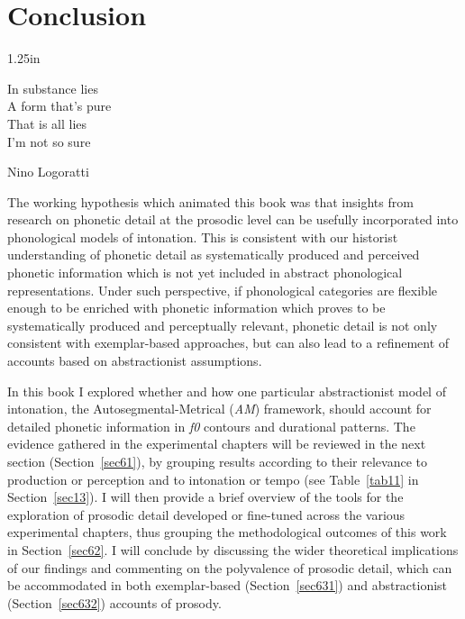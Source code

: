 \chapter{Conclusion}\label{sec6}
\epigraph{1.25in}{In substance lies\\A form that's pure\\That is all lies\\I'm not so sure}{Nino Logoratti}{}

The working hypothesis which animated this book was that insights from research on phonetic detail at the prosodic level can be usefully incorporated into phonological models of intonation. This is consistent with our historist understanding of phonetic detail as systematically produced and perceived phonetic information which is not yet included in abstract phonological representations. Under such perspective, if phonological categories are flexible enough to be enriched with phonetic information which proves to be systematically produced and perceptually relevant, phonetic detail is not only consistent with exemplar-based approaches, but can also lead to a refinement of accounts based on abstractionist assumptions. 

In this book I explored whether and how one particular abstractionist model of intonation, the Autosegmental-Metrical (\textit{AM}) framework, should account for detailed phonetic information in \textit{f0} contours and durational patterns. The evidence gathered in the experimental chapters will be reviewed in the next section (Section~\ref{sec61}), by grouping results according to their relevance to production or perception and to intonation or tempo (see Table~\ref{tab11} in Section~\ref{sec13}). I will then provide a brief overview of the tools for the exploration of prosodic detail developed or fine-tuned across the various experimental chapters, thus grouping the methodological outcomes of this work in Section~\ref{sec62}. I will conclude by discussing the wider theoretical implications of our findings and commenting on the polyvalence of prosodic detail, which can be accommodated in both exemplar-based (Section~\ref{sec631}) and abstractionist (Section~\ref{sec632}) accounts of prosody.

